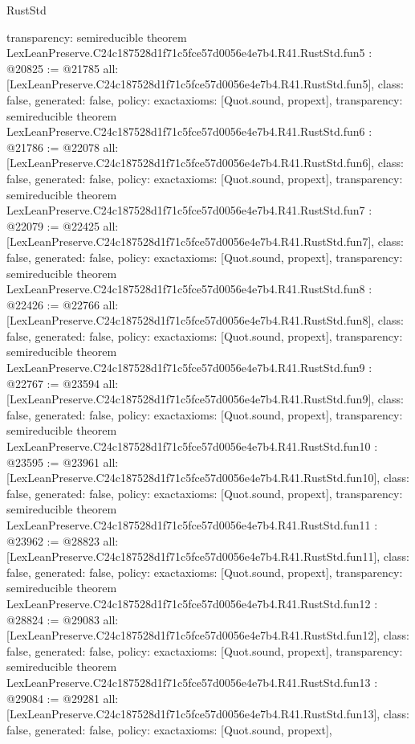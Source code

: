 \begin{lexlean}{RustStd}
\begin{coremodule}
{  transparency: semireducible
}
theorem LexLeanPreserve.C24c187528d1f71c5fce57d0056e4e7b4.R41.RustStd.fun5 : @20825 := @21785 {
  all: [LexLeanPreserve.C24c187528d1f71c5fce57d0056e4e7b4.R41.RustStd.fun5],
  class: false,
  generated: false,
  policy: exact{axioms: [Quot.sound, propext]},
  transparency: semireducible
}
theorem LexLeanPreserve.C24c187528d1f71c5fce57d0056e4e7b4.R41.RustStd.fun6 : @21786 := @22078 {
  all: [LexLeanPreserve.C24c187528d1f71c5fce57d0056e4e7b4.R41.RustStd.fun6],
  class: false,
  generated: false,
  policy: exact{axioms: [Quot.sound, propext]},
  transparency: semireducible
}
theorem LexLeanPreserve.C24c187528d1f71c5fce57d0056e4e7b4.R41.RustStd.fun7 : @22079 := @22425 {
  all: [LexLeanPreserve.C24c187528d1f71c5fce57d0056e4e7b4.R41.RustStd.fun7],
  class: false,
  generated: false,
  policy: exact{axioms: [Quot.sound, propext]},
  transparency: semireducible
}
theorem LexLeanPreserve.C24c187528d1f71c5fce57d0056e4e7b4.R41.RustStd.fun8 : @22426 := @22766 {
  all: [LexLeanPreserve.C24c187528d1f71c5fce57d0056e4e7b4.R41.RustStd.fun8],
  class: false,
  generated: false,
  policy: exact{axioms: [Quot.sound, propext]},
  transparency: semireducible
}
theorem LexLeanPreserve.C24c187528d1f71c5fce57d0056e4e7b4.R41.RustStd.fun9 : @22767 := @23594 {
  all: [LexLeanPreserve.C24c187528d1f71c5fce57d0056e4e7b4.R41.RustStd.fun9],
  class: false,
  generated: false,
  policy: exact{axioms: [Quot.sound, propext]},
  transparency: semireducible
}
theorem LexLeanPreserve.C24c187528d1f71c5fce57d0056e4e7b4.R41.RustStd.fun10 : @23595 := @23961 {
  all: [LexLeanPreserve.C24c187528d1f71c5fce57d0056e4e7b4.R41.RustStd.fun10],
  class: false,
  generated: false,
  policy: exact{axioms: [Quot.sound, propext]},
  transparency: semireducible
}
theorem LexLeanPreserve.C24c187528d1f71c5fce57d0056e4e7b4.R41.RustStd.fun11 : @23962 := @28823 {
  all: [LexLeanPreserve.C24c187528d1f71c5fce57d0056e4e7b4.R41.RustStd.fun11],
  class: false,
  generated: false,
  policy: exact{axioms: [Quot.sound, propext]},
  transparency: semireducible
}
theorem LexLeanPreserve.C24c187528d1f71c5fce57d0056e4e7b4.R41.RustStd.fun12 : @28824 := @29083 {
  all: [LexLeanPreserve.C24c187528d1f71c5fce57d0056e4e7b4.R41.RustStd.fun12],
  class: false,
  generated: false,
  policy: exact{axioms: [Quot.sound, propext]},
  transparency: semireducible
}
theorem LexLeanPreserve.C24c187528d1f71c5fce57d0056e4e7b4.R41.RustStd.fun13 : @29084 := @29281 {
  all: [LexLeanPreserve.C24c187528d1f71c5fce57d0056e4e7b4.R41.RustStd.fun13],
  class: false,
  generated: false,
  policy: exact{axioms: [Quot.sound, propext]},
}
\end{coremodule}
\end{lexlean}
